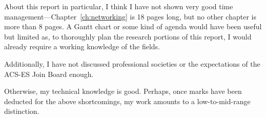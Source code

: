 \documentclass[11pt,a4paper]{report}
\begin{document}
	About this report in particular, I think I have not shown very good time management---Chapter~\ref{ch:networking} is 18 pages long, but no other chapter is more than 8 pages. A Gantt chart or some kind of agenda would have been useful but limited as, to thoroughly plan the research portions of this report, I would already require a working knowledge of the fields.
	
	Additionally, I have not discussed professional societies or the expectations of the ACS-ES Join Board enough. 
	
	Otherwise, my technical knowledge is good. Perhaps, once marks have been deducted for the above shortcomings, my work amounts to a low-to-mid-range distinction.
	
	
	
\end{document}
